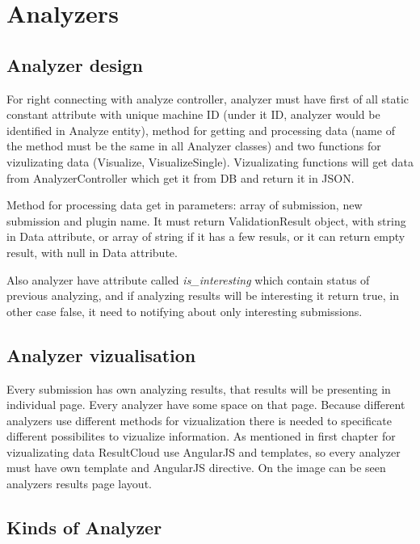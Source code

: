 \section{Analyzers}

\subsection{Analyzer design}

For right connecting with analyze controller, analyzer must have first of all static constant attribute with unique machine ID (under it ID, analyzer would be identified in Analyze entity), method for getting and processing data (name of the method must be the same in all Analyzer classes) and two functions for vizulizating data (Visualize, VisualizeSingle). Vizualizating functions will get data from AnalyzerController which get it from DB and return it in JSON.

Method for processing data get in parameters: array of submission, new submission and plugin name. It must return ValidationResult object, with string in Data attribute, or array of string if it has a few resuls, or it can return empty result, with null in Data attribute.

Also analyzer have attribute called \emph{is\_interesting} which contain status of previous analyzing, and if analyzing results will be interesting it return true, in other case false, it need to notifying about only interesting submissions.

\subsection{Analyzer vizualisation}

Every submission has own analyzing results, that results will be presenting in individual page. Every analyzer have some space on that page. Because different analyzers use different methods for vizualization there is needed to specificate different possibilites to vizualize information. As mentioned in first chapter for vizualizating data ResultCloud use AngularJS and templates, so every analyzer must have own template and AngularJS  directive. On the image can be seen analyzers results page layout.

\subsection{Kinds of Analyzer}

